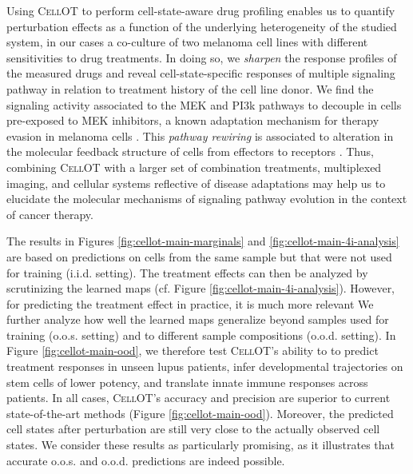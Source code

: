 Using \textsc{CellOT} to perform cell-state-aware drug profiling enables us to quantify perturbation effects as a function of the underlying heterogeneity of the studied system, in our cases a co-culture of two melanoma cell lines with different sensitivities to drug treatments. In doing so, we \textit{sharpen} the response profiles of the measured drugs and reveal cell-state-specific responses of multiple signaling pathway in relation to treatment history of the cell line donor. We find the signaling activity associated to the MEK and PI3k pathways to decouple in cells pre-exposed to MEK inhibitors, a known adaptation mechanism for therapy evasion in melanoma cells \cite{kun2021}. This \textit{pathway rewiring} is associated to alteration in the molecular feedback structure of cells from effectors to receptors \cite{kun2021, turke2012}. Thus, combining \textsc{CellOT} with a larger set of combination treatments, multiplexed imaging, and cellular systems reflective of disease adaptations may help us to elucidate the molecular mechanisms of signaling pathway evolution in the context of cancer therapy. 

The results in Figures \ref{fig:cellot-main-marginals} and \ref{fig:cellot-main-4i-analysis} are based on predictions on cells from the same sample but that were not used for training (i.i.d. setting). The treatment effects can then be analyzed by scrutinizing the learned maps (cf. Figure \ref{fig:cellot-main-4i-analysis}). However, for predicting the treatment effect in practice, it is much more relevant 
We further analyze how well the learned maps generalize beyond samples used for training (o.o.s. setting) and to different sample compositions (o.o.d. setting). In Figure \ref{fig:cellot-main-ood}, we therefore test \textsc{CellOT}'s ability to
to predict treatment responses in unseen lupus patients, infer developmental trajectories on stem cells of lower potency, and translate innate immune responses across patients.
In all cases, \textsc{CellOT}'s accuracy and precision are superior to current state-of-the-art methods (Figure \ref{fig:cellot-main-ood}).
 Moreover, the predicted cell states after perturbation are still very close to the actually observed cell states.
 We consider these results as particularly promising, as it illustrates that accurate o.o.s. and o.o.d. predictions are indeed possible.

